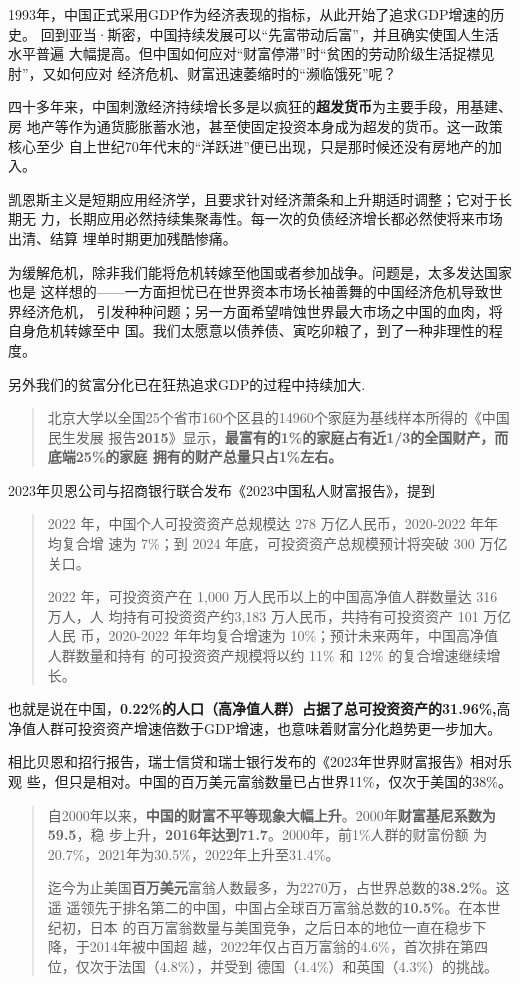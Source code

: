 1993年，中国正式采用GDP作为经济表现的指标，从此开始了追求GDP增速的历史。
回到亚当·斯密，中国持续发展可以“先富带动后富”，并且确实使国人生活水平普遍
大幅提高。但中国如何应对“财富停滞”时“贫困的劳动阶级生活捉襟见肘”，又如何应对
经济危机、财富迅速萎缩时的“濒临饿死”呢？

四十多年来，中国刺激经济持续增长多是以疯狂的\textbf{超发货币}为主要手段，用基建、房
地产等作为通货膨胀蓄水池，甚至使固定投资本身成为超发的货币。这一政策核心至少
自上世纪70年代末的“洋跃进”便已出现，只是那时候还没有房地产的加入。

凯恩斯主义是短期应用经济学，且要求针对经济萧条和上升期适时调整；它对于长期无
力，长期应用必然持续集聚毒性。每一次的负债经济增长都必然使将来市场出清、结算
埋单时期更加残酷惨痛。

为缓解危机，除非我们能将危机转嫁至他国或者参加战争。问题是，太多发达国家也是
这样想的——一方面担忧已在世界资本市场长袖善舞的中国经济危机导致世界经济危机，
引发种种问题；另一方面希望啃蚀世界最大市场之中国的血肉，将自身危机转嫁至中
国。我们太愿意以债养债、寅吃卯粮了，到了一种非理性的程度。

另外我们的贫富分化已在狂热追求GDP的过程中持续加大.

\begin{quotation}
  北京大学以全国25个省市160个区县的14960个家庭为基线样本所得的《中国民生发展
  报告\textbf{2015}》显示，\textbf{最富有的1\%的家庭占有近1/3的全国财产，而底端25\%的家庭
    拥有的财产总量只占1\%左右。}\cite{dajueqi}
\end{quotation}

2023年贝恩公司与招商银行联合发布《2023中国私人财富报告》，提到
\begin{quotation}
  2022 年，中国个人可投资资产总规模达 278 万亿人民币，2020-2022 年年均复合增
  速为 7\%；到 2024 年底，可投资资产总规模预计将突破 300 万亿关口。

  2022 年，可投资资产在 1,000 万人民币以上的中国高净值人群数量达 316 万人，人
  均持有可投资资产约3,183 万人民币，共持有可投资资产 101 万亿人民
  币，2020-2022 年年均复合增速为 10\%；预计未来两年，中国高净值人群数量和持有
  的可投资资产规模将以约 11\% 和 12\% 的复合增速继续增长。
\end{quotation}
也就是说在中国，\textbf{0.22\%的人口（高净值人群）占据了总可投资资产的31.96\%,}高
净值人群可投资资产增速倍数于GDP增速，也意味着财富分化趋势更一步加大。

相比贝恩和招行报告，瑞士信贷和瑞士银行发布的《2023年世界财富报告》相对乐观
些，但只是相对。中国的百万美元富翁数量已占世界11\%，仅次于美国的38\%。
\begin{quotation}
  自2000年以来，\textbf{中国的财富不平等现象大幅上升}。2000年\textbf{财富基尼系数为59.5}，稳
  步上升，\textbf{2016年达到71.7}。2000年，前1\%人群的财富份额
  为20.7\%，2021年为30.5\%，2022年上升至31.4\%。

  迄今为止美国\textbf{百万美元}富翁人数最多，为2270万，占世界总数的\textbf{38.2\%}。这遥
  遥领先于排名第二的中国，中国占全球百万富翁总数的\textbf{10.5\%}。在本世纪初，日本
  的百万富翁数量与美国竞争，之后日本的地位一直在稳步下降，于2014年被中国超
  越，2022年仅占百万富翁的4.6\%，首次排在第四位，仅次于法国（4.8\%），并受到
  德国（4.4\%）和英国（4.3\%）的挑战。
\end{quotation}

